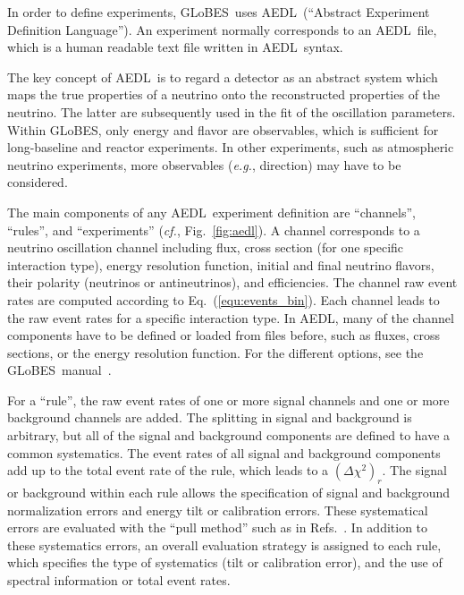 \documentclass[12pt,a4paper]{article}
\newcommand{\eg}{{\it e.g.}}
\newcommand{\cf}{{\it cf.}}
\newcommand{\eq}{Eq.}
\newcommand{\fig}{Fig.}
\newcommand{\Refs}{Refs.}
\newcommand{\GLOBES}{{\sf GLoBES}}
\newcommand{\AEDL}{{\sf AEDL}}
\newcommand{\equ}[1]{\eq~(\ref{equ:#1})}
\newcommand{\figu}[1]{\fig~\ref{fig:#1}}
\begin{document}
In order to define experiments, \GLOBES\ uses \AEDL\ (``Abstract
Experiment Definition Language''). An experiment normally corresponds
to an \AEDL\ file, which is a human readable text file written 
in \AEDL\ syntax.

The key concept of \AEDL\ is to regard a detector as an abstract system
which maps the true properties of a neutrino onto the reconstructed properties
of the neutrino. The latter are subsequently used in the fit of the oscillation
parameters. Within \GLOBES , only energy and flavor are  
observables, which is
sufficient for long-baseline and reactor experiments. In  other
experiments, such as atmospheric neutrino experiments, more observables 
(\eg , direction) may have to be considered.

The main components of any \AEDL\ experiment definition are ``channels'',
``rules'', and ``experiments'' (\cf, \figu{aedl}). A channel corresponds to a neutrino oscillation channel including flux, cross section (for one specific interaction type), energy resolution function, initial and final neutrino flavors, their polarity (neutrinos or antineutrinos), and efficiencies. The channel raw event rates are computed according to \equ{events_bin}. Each channel leads to the raw event rates for a 
specific interaction type. In \AEDL , many of the channel components
have to be defined or loaded from files before, such as fluxes, 
cross sections, or the energy resolution function. For the
different options, see the \GLOBES\ manual~\cite{Manual}.

For a ``rule'', the raw event rates of one or more signal channels and
one or more background channels are added. The splitting in signal and
background is arbitrary, but all of the signal and background components
are defined to have a common systematics. The event rates of all 
signal and background components add up to the total event rate of the
rule, which leads to a $(\Delta \chi^2)_r$. The signal or background
within each rule allows the specification of signal and background 
normalization errors and energy tilt or calibration errors. 
These systematical errors are evaluated with the ``pull method'' such as 
in \Refs~\cite{Huber:2002mx,Fogli:2002pt}.  
In addition to these
systematics errors, an overall evaluation strategy is assigned 
to each rule, which specifies the type of systematics (tilt or calibration
error), and the use of spectral information or total event rates.   
\end{document}
